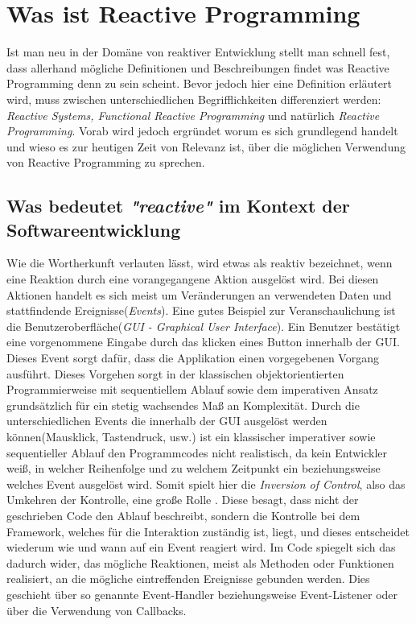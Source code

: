 \chapter{Was ist Reactive Programming}\label{was_ist_reactive_programming}
Ist man neu in der Domäne von reaktiver Entwicklung stellt man schnell fest, dass allerhand mögliche Definitionen und Beschreibungen findet was Reactive Programming denn zu sein scheint. Bevor jedoch hier eine Definition erläutert wird, muss zwischen unterschiedlichen Begrifflichkeiten differenziert werden: \textit{Reactive Systems, Functional Reactive Programming} und natürlich \textit{Reactive Programming}. Vorab wird jedoch ergründet worum es sich grundlegend handelt und wieso es zur heutigen Zeit von Relevanz ist, über die möglichen Verwendung von Reactive Programming zu sprechen.
\section{Was bedeutet \textit{"reactive"} im Kontext der Softwareentwicklung}
Wie die Wortherkunft verlauten lässt, wird etwas als reaktiv bezeichnet, wenn eine Reaktion durch eine vorangegangene Aktion ausgelöst wird. Bei diesen Aktionen handelt es sich meist um Veränderungen an verwendeten Daten und stattfindende Ereignisse(\textit{Events}). Eine gutes Beispiel zur Veranschaulichung ist die Benutzeroberfläche(\textit{GUI - Graphical User Interface}). Ein Benutzer bestätigt eine vorgenommene Eingabe durch das klicken eines Button innerhalb der GUI. Dieses Event sorgt dafür, dass die Applikation einen vorgegebenen Vorgang ausführt. Dieses Vorgehen sorgt in der klassischen objektorientierten Programmierweise mit sequentiellem Ablauf sowie dem imperativen Ansatz grundsätzlich für ein stetig wachsendes Maß an Komplexität. Durch die unterschiedlichen Events die innerhalb der GUI ausgelöst werden können(Mausklick, Tastendruck, usw.) ist ein klassischer imperativer sowie sequentieller Ablauf den Programmcodes nicht realistisch, da kein Entwickler weiß, in welcher Reihenfolge und zu welchem Zeitpunkt ein beziehungsweise welches Event ausgelöst wird. Somit spielt hier die \textit{Inversion of Control}, also das Umkehren der Kontrolle, eine große Rolle \cite{MartinFowler.2005}. Diese besagt, dass nicht der geschrieben Code den Ablauf beschreibt, sondern die Kontrolle bei dem Framework, welches für die Interaktion zuständig ist, liegt, und dieses entscheidet wiederum wie und wann auf ein Event reagiert wird. Im Code spiegelt sich das dadurch wider, das mögliche Reaktionen, meist als Methoden oder Funktionen realisiert, an die mögliche eintreffenden Ereignisse gebunden werden. Dies geschieht über so genannte Event-Handler beziehungsweise Event-Listener oder über die Verwendung von Callbacks. 


